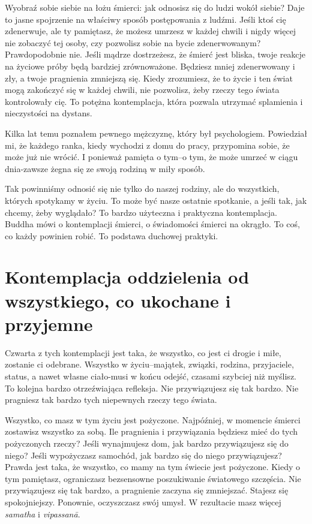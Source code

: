 \documentclass[12pt,openany]{book}
\begin{document}
Wyobraź sobie siebie na łożu śmierci: jak odnosisz się do ludzi wokół siebie? Daje to jasne spojrzenie na właściwy sposób postępowania z ludźmi. Jeśli ktoś cię zdenerwuje, ale ty pamiętasz, że możesz umrzesz w każdej chwili i nigdy więcej nie zobaczyć tej osoby, czy pozwolisz sobie na bycie zdenerwowanym? Prawdopodobnie nie. Jeśli mądrze dostrzeżesz, że śmierć jest bliska, twoje reakcje na życiowe próby będą bardziej zrównoważone. Będziesz mniej zdenerwowany i zły, a twoje pragnienia zmniejszą się. Kiedy zrozumiesz, że to życie i ten świat mogą zakończyć się w każdej chwili, nie pozwolisz, żeby rzeczy tego świata kontrolowały cię. To potężna kontemplacja, która pozwala utrzymać splamienia i nieczystości na dystans.

Kilka lat temu poznałem pewnego mężczyznę, który był psychologiem. Powiedział mi, że każdego ranka, kiedy wychodzi z domu do pracy, przypomina sobie, że może już nie wrócić. I ponieważ pamięta o tym–o tym, że może umrzeć w ciągu dnia-zawsze żegna się ze swoją rodziną w miły sposób.

Tak powinniśmy odnosić się nie tylko do naszej rodziny, ale do wszystkich, których spotykamy w życiu. To może być nasze ostatnie spotkanie, a jeśli tak, jak chcemy, żeby wyglądało? To bardzo użyteczna i praktyczna kontemplacja. Buddha mówi o kontemplacji śmierci, o świadomości śmierci na okrągło. To coś, co każdy powinien robić. To podstawa duchowej praktyki.

\section*{Kontemplacja oddzielenia od wszystkiego, co ukochane i przyjemne}

Czwarta z tych kontemplacji jest taka, że wszystko, co jest ci drogie i miłe, zostanie ci odebrane. Wszystko w życiu–majątek, związki, rodzina, przyjaciele, status, a nawet własne ciało-musi w końcu odejść, czasami szybciej niż myślisz. To kolejna bardzo otrzeźwiająca refleksja. Nie przywiązujesz się tak bardzo. Nie pragniesz tak bardzo tych niepewnych rzeczy tego świata.

Wszystko, co masz w tym życiu jest pożyczone. Najpóźniej, w momencie śmierci zostawisz wszystko za sobą. Ile pragnienia i przywiązania będziesz mieć do tych pożyczonych rzeczy? Jeśli wynajmujesz dom, jak bardzo przywiązujesz się do niego? Jeśli wypożyczasz samochód, jak bardzo się do niego przywiązujesz? Prawda jest taka, że wszystko, co mamy na tym świecie jest pożyczone. Kiedy o tym pamiętasz, ograniczasz bezsensowne poszukiwanie światowego szczęścia. Nie przywiązujesz się tak bardzo, a pragnienie zaczyna się zmniejszać. Stajesz się spokojniejszy. Ponownie, oczyszczasz swój umysł. W rezultacie masz więcej \textit{samatha} i \textit{vipassanā}.
\end{document}
